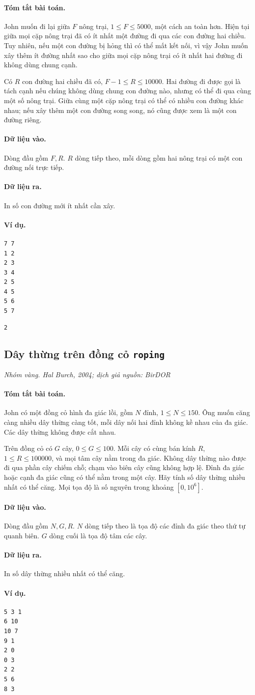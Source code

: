 \documentclass[11pt]{article}
\newcommand{\problem}[4]{%
  \subsection[#1 (#2)]{#1 \hfill {\normalsize\texttt{#2}}}%
  \noindent\textit{#3. #4}\par\smallskip
}
\newcommand{\iosec}[1]{\paragraph{#1}}
\begin{document}
\iosec{Tóm tắt bài toán.}
John muốn đi lại giữa \(F\) nông trại, \(1\le F\le 5000\), một cách an toàn
hơn. Hiện tại giữa mọi cặp nông trại đã có ít nhất một đường đi qua các con
đường hai chiều. Tuy nhiên, nếu một con đường bị hỏng thì có thể mất kết nối,
vì vậy John muốn xây thêm ít đường nhất sao cho giữa mọi cặp nông trại có
ít nhất hai đường đi không dùng chung cạnh.

Có \(R\) con đường hai chiều đã có, \(F-1\le R\le 10000\). Hai đường đi được
gọi là tách cạnh nếu chúng không dùng chung con đường nào, nhưng có thể đi
qua cùng một số nông trại. Giữa cùng một cặp nông trại có thể có nhiều con
đường khác nhau; nếu xây thêm một con đường song song, nó cũng được xem là
một con đường riêng.

\iosec{Dữ liệu vào.}
Dòng đầu gồm \(F,R\). \(R\) dòng tiếp theo, mỗi dòng gồm hai nông trại có một
con đường nối trực tiếp.

\iosec{Dữ liệu ra.}
In số con đường mới ít nhất cần xây.

\iosec{Ví dụ.}
\begin{verbatim}
7 7
1 2
2 3
3 4
2 5
4 5
5 6
5 7
\end{verbatim}

\begin{verbatim}
2
\end{verbatim}

\problem{Dây thừng trên đồng cỏ}{roping}{Nhóm vàng}{Hal Burch, 2004; dịch giả nguồn: BirDOR}

\iosec{Tóm tắt bài toán.}
John có một đồng cỏ hình đa giác lồi, gồm \(N\) đỉnh,
\(1\le N\le 150\). Ông muốn căng càng nhiều dây thừng càng tốt, mỗi dây nối
hai đỉnh không kề nhau của đa giác. Các dây thừng không được cắt nhau.

Trên đồng cỏ có \(G\) cây, \(0\le G\le 100\). Mỗi cây có cùng bán kính
\(R\), \(1\le R\le 100000\), và mọi tâm cây nằm trong đa giác. Không dây
thừng nào được đi qua phần cây chiếm chỗ; chạm vào biên cây cũng không hợp
lệ. Đỉnh đa giác hoặc cạnh đa giác cũng có thể nằm trong một cây. Hãy tính số
dây thừng nhiều nhất có thể căng. Mọi tọa độ là số nguyên trong khoảng
\([0,10^6]\).

\iosec{Dữ liệu vào.}
Dòng đầu gồm \(N,G,R\). \(N\) dòng tiếp theo là tọa độ các đỉnh đa giác theo
thứ tự quanh biên. \(G\) dòng cuối là tọa độ tâm các cây.

\iosec{Dữ liệu ra.}
In số dây thừng nhiều nhất có thể căng.

\iosec{Ví dụ.}
\begin{verbatim}
5 3 1
6 10
10 7
9 1
2 0
0 3
2 2
5 6
8 3
\end{verbatim}
\end{document}

